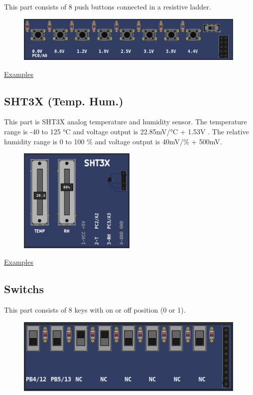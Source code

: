 This part consists of 8 push buttons connected in a resistive ladder.

\begin{figure}[H]
\center
\includegraphics[width=0.99\textwidth]{img/part_push_a.png} 
\end{figure}

\href{https://lcgamboa.github.io/picsimlab_examples/Parts.html\#Push_Buttons_(Analogic)}{Examples}

\subsection{SHT3X (Temp. Hum.)}

This part is SHT3X analog temperature and humidity sensor. The temperature  range is -40 to 125 °C  and 
voltage output is 22.85mV/°C + 1.53V . The relative humidity range is 0 to 100 \%  and voltage output is 40mV/\% + 500mV.

\begin{figure}[H]
\center
\includegraphics[width=0.5\textwidth]{img/part_sht3x.png} 
\end{figure} 


\href{https://lcgamboa.github.io/picsimlab_examples/Parts.html\#SHT3X_(Temp._Hum.)}{Examples}



\subsection{Switchs}
This part consists of 8 keys with on or off position (0 or 1).

\begin{figure}[H]
\center
\includegraphics[width=0.99\textwidth]{img/part_switchs.png} 
\end{figure} 

